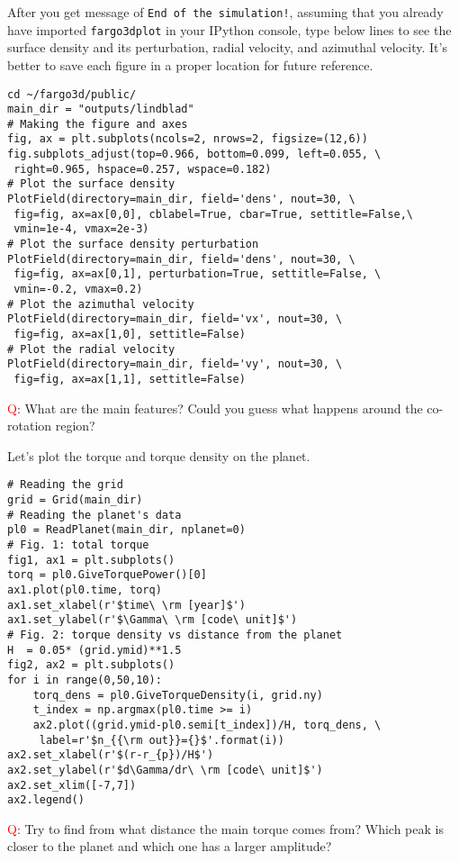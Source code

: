 \documentclass[14pt]{scrartcl}
\begin{document}
After you get message of \texttt{End of the simulation!}, assuming that you already have imported \texttt{fargo3dplot} in your IPython console, type below lines to see the surface density and its perturbation, radial velocity, and azimuthal velocity. It's better to save each figure in a proper location for future reference.
\begin{verbatim}
cd ~/fargo3d/public/
main_dir = "outputs/lindblad"
# Making the figure and axes
fig, ax = plt.subplots(ncols=2, nrows=2, figsize=(12,6))
fig.subplots_adjust(top=0.966, bottom=0.099, left=0.055, \
 right=0.965, hspace=0.257, wspace=0.182)
# Plot the surface density
PlotField(directory=main_dir, field='dens', nout=30, \ 
 fig=fig, ax=ax[0,0], cblabel=True, cbar=True, settitle=False,\ 
 vmin=1e-4, vmax=2e-3)
# Plot the surface density perturbation
PlotField(directory=main_dir, field='dens', nout=30, \
 fig=fig, ax=ax[0,1], perturbation=True, settitle=False, \
 vmin=-0.2, vmax=0.2)
# Plot the azimuthal velocity
PlotField(directory=main_dir, field='vx', nout=30, \ 
 fig=fig, ax=ax[1,0], settitle=False)
# Plot the radial velocity
PlotField(directory=main_dir, field='vy', nout=30, \
 fig=fig, ax=ax[1,1], settitle=False)
\end{verbatim}

\textcolor{red}{Q}: What are the main features? Could you guess what happens around the co-rotation region?

Let's plot the torque and torque density on the planet. 
\begin{verbatim}
# Reading the grid
grid = Grid(main_dir)
# Reading the planet's data
pl0 = ReadPlanet(main_dir, nplanet=0)
# Fig. 1: total torque
fig1, ax1 = plt.subplots()
torq = pl0.GiveTorquePower()[0]
ax1.plot(pl0.time, torq)
ax1.set_xlabel(r'$time\ \rm [year]$')
ax1.set_ylabel(r'$\Gamma\ \rm [code\ unit]$')
# Fig. 2: torque density vs distance from the planet
H  = 0.05* (grid.ymid)**1.5
fig2, ax2 = plt.subplots()
for i in range(0,50,10):
    torq_dens = pl0.GiveTorqueDensity(i, grid.ny)
    t_index = np.argmax(pl0.time >= i)
    ax2.plot((grid.ymid-pl0.semi[t_index])/H, torq_dens, \
     label=r'$n_{{\rm out}}={}$'.format(i))
ax2.set_xlabel(r'$(r-r_{p})/H$')
ax2.set_ylabel(r'$d\Gamma/dr\ \rm [code\ unit]$')
ax2.set_xlim([-7,7])
ax2.legend()
\end{verbatim}

\textcolor{red}{Q}: Try to find from what distance the main torque comes from? Which peak is closer to the planet and which one has a larger amplitude?
\end{document}
